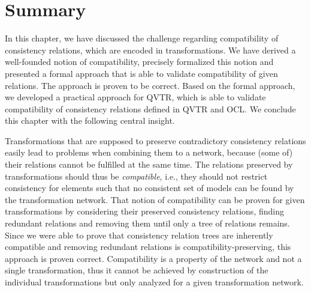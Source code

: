 \section{Summary}

In this chapter, we have discussed the challenge regarding compatibility of consistency relations, which are encoded in transformations.
We have derived a well-founded notion of compatibility, precisely formalized this notion and presented a formal approach that is able to validate compatibility of given relations.
The approach is proven to be correct.
Based on the formal approach, we developed a practical approach for \gls{QVTR}, which is able to validate compatibility of consistency relations defined in \gls{QVTR} and \gls{OCL}.
We conclude this chapter with the following central insight.

\begin{insight}[Compatibility]
    Transformations that are supposed to preserve contradictory consistency relations easily lead to problems when combining them to a network, because (some of) their relations cannot be fulfilled at the same time.
    The relations preserved by transformations should thus be \emph{compatible}, i.e., they should not restrict consistency for elements such that no consistent set of models can be found by the transformation network.
    That notion of compatibility can be proven for given transformations by considering their preserved consistency relations, finding redundant relations and removing them until only a tree of relations remains. Since we were able to prove that consistency relation trees are inherently compatible and removing redundant relations is compatibility-preserving, this approach is proven correct.
    Compatibility is a property of the network and not a single transformation, thus it cannot be achieved by construction of the individual transformations but only analyzed for a given transformation network.
\end{insight}

